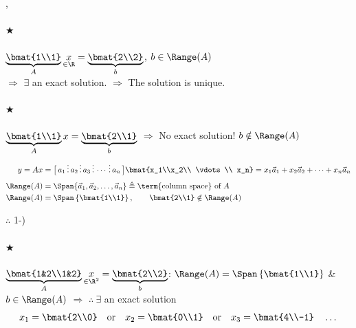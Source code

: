\sep
\paragraph{$\bigstar$} $\displaystyle \underbrace{\bmat{1\\1}}_{A}\underset{\in\R}{x} = \underbrace{\bmat{2\\2}}_{b}$,
\qquad $b\in\Range(A)$\\
$\Rightarrow$ $\exists$ an exact solution. \quad $\Rightarrow$ The solution is unique.

\paragraph{$\bigstar$} $\displaystyle \underbrace{\bmat{1\\1}}_{A}x = \underbrace{\bmat{2\\1}}_{b}$
\quad $\Rightarrow$ No exact solution! \qquad $b\notin\Range(A)$
\begin{align*}
y = Ax &= \big[\,a_1 \,\vdots\, a_2 \,\vdots\, a_3 \,\vdots\, \cdots \,\vdots\, a_n\,\big]\bmat{x_1\\x_2\\ \vdots\\ x_n}
= x_1\vec a_1 + x_2\vec a_2 + \dots + x_n\vec a_n\\[4pt]
\Range(A) &= \Span\{\vec a_1,\vec a_2,\dots,\vec a_n\} \triangleq \text{\term{column space} of } A\\
\Range(A) &= \Span\left\{\bmat{1\\1}\right\}, \qquad \bmat{2\\1}\notin\Range(A)
\end{align*}

\begin{keybox}
$\therefore$ 1-) 
\end{keybox}

\paragraph{$\bigstar$} $\displaystyle \underbrace{\bmat{1&2\\1&2}}_{A}\underset{\in\R^2}{x} = \underbrace{\bmat{2\\2}}_{b}$:
\quad $\Range(A) = \Span\left\{\bmat{1\\1}\right\}$ \& $b\in\Range(A)$ $\Rightarrow$ $\therefore\ \exists$ an exact solution
\[
x_1 = \bmat{2\\0} \quad\text{or}\quad x_2 = \bmat{0\\1} \quad\text{or}\quad x_3 = \bmat{4\\-1} \quad\dots
\]

